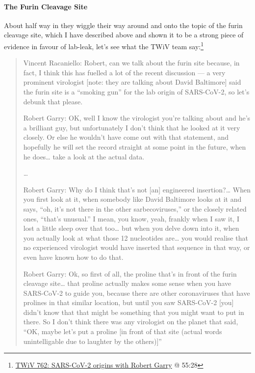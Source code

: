 \documentclass[11pt]{article}
\begin{document}
\paragraph{The Furin Cleavage Site}
\label{sec:org1ee92e5}
About half way in they wiggle their way around and onto the topic of the furin cleavage site, which I have described above and shown it to be a strong piece of evidence in favour of lab-leak, let's see what the TWiV team say:\footnote{\href{https://youtu.be/IxwrDSYrhjU?t=3328}{TWiV 762: SARS-CoV-2 origins with Robert Garry} @ 55:28}
\begin{quote}
Vincent Racaniello: Robert, can we talk about the furin site because, in fact, I think this has fuelled a lot of the recent discussion --- a very prominent virologist [note: they are talking about David Baltimore] said the furin site is a ``smoking gun'' for the lab origin of SARS-CoV-2, so let's debunk that please.

Robert Garry: OK, well I know the virologist you're talking about and he's a brilliant guy, but unfortunately I don't think that he looked at it very closely. Or else he wouldn't have come out with that statement, and hopefully he will set the record straight at some point in the future, when he does\ldots{} take a look at the actual data.

\ldots{}

Robert Garry: Why do I think that's not [an] engineered insertion?\ldots{} When you first look at it, when somebody like David Baltimore looks at it and says, ``oh, it's not there in the other sarbecoviruses,'' or the closely related ones, ``that's unusual.'' I mean, you know, yeah, frankly when I saw it, I lost a little sleep over that too\ldots{} but when you delve down into it, when you actually look at what those 12 nucleotides are\ldots{} you would realise that no experienced virologist would have inserted that sequence in that way, or even have known how to do that.

Robert Garry: Ok, so first of all, the proline that's in front of the furin cleavage site\ldots{} that proline actually makes some sense when you have SARS-CoV-2 to guide you, because there are other coronaviruses that have prolines in that similar location, but until you saw SARS-CoV-2 [you] didn't know that that might be something that you might want to put in there. So I don't think there was any virologist on the planet that said, ``OK, maybe let's put a proline [in front of that site (actual words unintelligable due to laughter by the others)]''
\end{quote}
\end{document}
